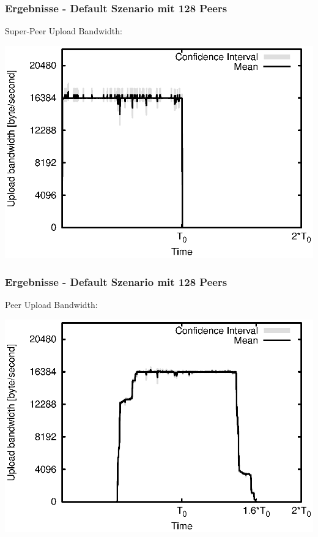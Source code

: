 \begin{frame}
  \frametitle{Ergebnisse - Default Szenario mit 128 Peers}
  Super-Peer Upload Bandwidth:
  
  \begin{center}
    \includegraphics[width=1\textwidth]{fig/plots/scenario_4_peer_count_128/plots/GeneratedMeanCurrentSuperSeederUploadBandwidth.csv.eps}
  \end{center}
\end{frame}


\begin{frame}
  \frametitle{Ergebnisse - Default Szenario mit 128 Peers}
  Peer Upload Bandwidth:
  
  \begin{center}
    \includegraphics[width=1\textwidth]{fig/plots/scenario_4_peer_count_128/plots/GeneratedMeanCurrentUploadBandwidth.csv.eps}
  \end{center}
\end{frame}


